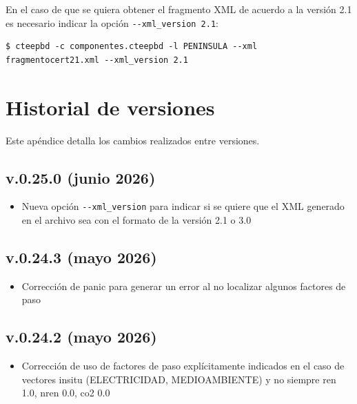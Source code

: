 \documentclass[10pt,notitlepage,oneside,a4paper]{article}
\begin{document}
En el caso de que se quiera obtener el fragmento XML de acuerdo a la versión 2.1 es necesario indicar la opción \texttt{-{}-xml\_version 2.1}:

\begin{Verbatim}[fontsize=\small]
    $ cteepbd -c componentes.cteepbd -l PENINSULA --xml fragmentocert21.xml --xml_version 2.1
\end{Verbatim}

\clearpage
\newpage
\section{Historial de versiones}
\label{sec:anexocambios}
\setcounter{figure}{0} %
\setcounter{table}{0} %

Este apéndice detalla los cambios realizados entre versiones.

\subsection{v.0.25.0 (junio 2026)}

\begin{itemize}
\item  Nueva opción \texttt{-{}-xml\_version} para indicar si se quiere que el XML generado en el archivo sea con el formato de la versión 2.1 o 3.0
\end{itemize}

\subsection{v.0.24.3 (mayo 2026)}

\begin{itemize}
\item  Corrección de panic para generar un error al no localizar algunos factores de paso
\end{itemize}

\subsection{v.0.24.2 (mayo 2026)}

\begin{itemize}
\item  Corrección de uso de factores de paso explícitamente indicados en el caso de vectores insitu (ELECTRICIDAD, MEDIOAMBIENTE) y no siempre ren 1.0, nren 0.0, co2 0.0
\end{itemize}
\end{document}
